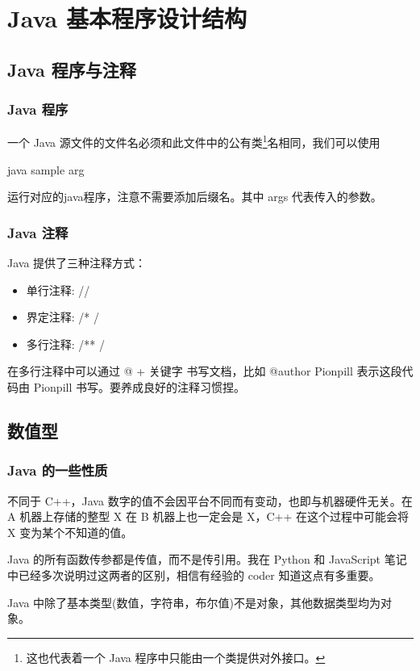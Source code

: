 \section{Java 基本程序设计结构}
\subsection{Java 程序与注释}
\subsubsection{Java 程序}

一个 Java 源文件的文件名必须和此文件中的公有类\footnote{这也代表着一个 Java 程序中只能由一个类提供对外接口。}名相同，我们可以使用
\begin{Java}
java sample arg
\end{Java}
运行对应的java程序，注意不需要添加后缀名。其中 args 代表传入的参数。

\subsubsection{Java 注释}

Java 提供了三种注释方式：
\begin{itemize}
    \item 单行注释: //
    \item 界定注释: /* \quad */
    \item 多行注释: /** \quad */
\end{itemize}
在多行注释中可以通过 @ + 关键字 书写文档，比如 @author Pionpill 表示这段代码由 Pionpill 书写。要养成良好的注释习惯捏。

\subsection{数值型}
\subsubsection{Java 的一些性质}

不同于 C++，Java 数字的值不会因平台不同而有变动，也即与机器硬件无关。在 A 机器上存储的整型 X 在 B 机器上也一定会是 X，C++ 在这个过程中可能会将 X 变为某个不知道的值。

Java 的所有函数传参都是传值，而不是传引用。我在 Python 和 JavaScript 笔记中已经多次说明过这两者的区别，相信有经验的 coder 知道这点有多重要。

Java 中除了基本类型(数值，字符串，布尔值)不是对象，其他数据类型均为对象。

